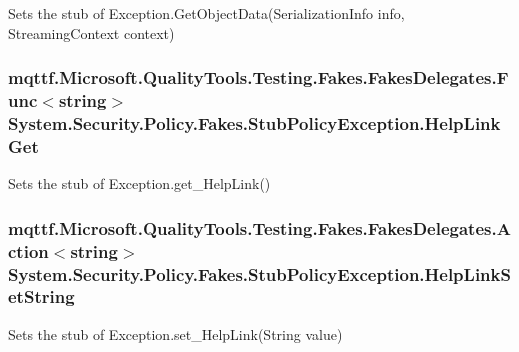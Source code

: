 Sets the stub of Exception.\-Get\-Object\-Data(\-Serialization\-Info info, Streaming\-Context context)

\hypertarget{class_system_1_1_security_1_1_policy_1_1_fakes_1_1_stub_policy_exception_a2dec654bb84edf46897fcdd9cf6bbf95}{
\subsubsection[{Help\-Link\-Get}]{\setlength{\rightskip}{0pt plus 5cm}mqttf.\-Microsoft.\-Quality\-Tools.\-Testing.\-Fakes.\-Fakes\-Delegates.\-Func$<$string$>$ System.\-Security.\-Policy.\-Fakes.\-Stub\-Policy\-Exception.\-Help\-Link\-Get}}\label{class_system_1_1_security_1_1_policy_1_1_fakes_1_1_stub_policy_exception_a2dec654bb84edf46897fcdd9cf6bbf95}


Sets the stub of Exception.\-get\-\_\-\-Help\-Link()

\hypertarget{class_system_1_1_security_1_1_policy_1_1_fakes_1_1_stub_policy_exception_a2693e62d1c1405f958b178aca5c7f40f}{
\subsubsection[{Help\-Link\-Set\-String}]{\setlength{\rightskip}{0pt plus 5cm}mqttf.\-Microsoft.\-Quality\-Tools.\-Testing.\-Fakes.\-Fakes\-Delegates.\-Action$<$string$>$ System.\-Security.\-Policy.\-Fakes.\-Stub\-Policy\-Exception.\-Help\-Link\-Set\-String}}\label{class_system_1_1_security_1_1_policy_1_1_fakes_1_1_stub_policy_exception_a2693e62d1c1405f958b178aca5c7f40f}


Sets the stub of Exception.\-set\-\_\-\-Help\-Link(\-String value)

